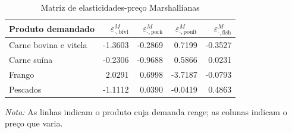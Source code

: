 
\begin{table}[H]
\centering
\caption{Matriz de elasticidades-preço Marshallianas}
\label{tab:elasticidades-marshallianas}
\small
\begin{tabular}{@{}lrrrr@{}}
\toprule
Produto demandado & $\varepsilon^M_{\cdot,\text{bfvl}}$ & $\varepsilon^M_{\cdot,\text{pork}}$ & $\varepsilon^M_{\cdot,\text{poult}}$ & $\varepsilon^M_{\cdot,\text{fish}}$ \\
\midrule
Carne bovina e vitela & -1.3603 & -0.2869 & 0.7199 & -0.3527 \\
Carne suína & -0.2306 & -0.9688 & 0.5866 & 0.0231 \\
Frango & 2.0291 & 0.6998 & -3.7187 & -0.0793 \\
Pescados & -1.1112 & 0.0390 & -0.0419 & 0.4863 \\
\bottomrule
\end{tabular}
\par\vspace{0.35em}
\begin{minipage}{0.92\textwidth}\footnotesize \textit{Nota:} As linhas indicam o produto cuja demanda reage; as colunas indicam o preço que varia.\end{minipage}
\end{table}
